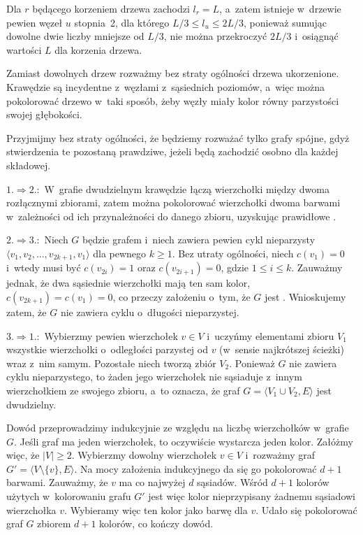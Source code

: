 Dla $r$ będącego korzeniem drzewa zachodzi $l_r=L$, a~zatem istnieje w~drzewie pewien węzeł $u$ stopnia~2, dla którego $L/3\le l_u\le 2L/3$, ponieważ sumując dowolne dwie liczby mniejsze od $L/3$, nie można przekroczyć $2L/3$ i~osiągnąć wartości $L$ dla korzenia drzewa.

\problems


\subproblem %
Zamiast dowolnych drzew rozważmy bez straty ogólności drzewa ukorzenione. Krawędzie są incydentne z~węzłami z~sąsiednich poziomów, a~więc można pokolorować drzewo w~taki sposób, żeby węzły miały kolor równy parzystości swojej głębokości.

\subproblem %
Przyjmijmy bez straty ogólności, że będziemy rozważać tylko grafy spójne, gdyż stwierdzenia te pozostaną prawdziwe, jeżeli będą zachodzić osobno dla każdej składowej.
\bigskip

$1.\Rightarrow 2.\!\!:$ W~grafie dwudzielnym krawędzie łączą wierzchołki między dwoma rozłącznymi zbiorami, zatem można pokolorować wierzchołki dwoma barwami w~zależności od ich przynależności do danego zbioru, uzyskując prawidłowe .
\bigskip

$2.\Rightarrow 3.\!\!:$ Niech $G$ będzie grafem  i~niech zawiera pewien cykl nieparzysty $\langle v_1,v_2,\dots,v_{2k+1},v_1\rangle$ dla pewnego $k\ge1$. Bez utraty ogólności, niech $c(v_1)=0$ i~wtedy musi być $c(v_{2i})=1$ oraz $c(v_{2i+1})=0$, gdzie $1\le i\le k$. Zauważmy jednak, że dwa sąsiednie wierzchołki mają ten sam kolor, $c(v_{2k+1})=c(v_1)=0$, co przeczy założeniu o~tym, że $G$ jest . Wnioskujemy zatem, że $G$ nie zawiera cyklu o~długości nieparzystej.
\bigskip

$3.\Rightarrow 1.\!\!:$ Wybierzmy pewien wierzchołek $v\in V$ i~uczyńmy elementami zbioru $V_1$ wszystkie wierzchołki o~odległości parzystej od $v$ (w~sensie najkrótszej ścieżki) wraz z~nim samym. Pozostałe niech tworzą zbiór $V_2$. Ponieważ $G$ nie zawiera cyklu nieparzystego, to żaden jego wierzchołek nie sąsiaduje z~innym wierzchołkiem ze swojego zbioru, a~to oznacza, że graf $G=\langle V_1\cup V_2,E\rangle$ jest dwudzielny.

\subproblem %
Dowód przeprowadzimy indukcyjnie ze względu na liczbę wierzchołków w~grafie $G$. Jeśli graf ma jeden wierzchołek, to oczywiście wystarcza jeden kolor. Załóżmy więc, że $|V|\ge2$. Wybierzmy dowolny wierzchołek $v\in V$ i~rozważmy graf $G'=\bigl\langle V\setminus\{v\},E\bigr\rangle$. Na mocy założenia indukcyjnego da się go pokolorować $d+1$ barwami. Zauważmy, że $v$ ma co najwyżej $d$ sąsiadów. Wśród $d+1$ kolorów użytych w~kolorowaniu grafu $G'$ jest więc kolor nieprzypisany żadnemu sąsiadowi wierzchołka $v$. Wybieramy więc ten kolor jako barwę dla $v$. Udało się pokolorować graf $G$ zbiorem $d+1$ kolorów, co kończy dowód.

